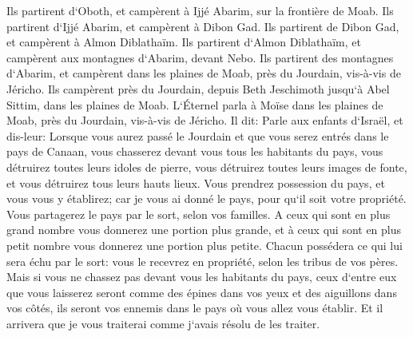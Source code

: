 \verse Ils partirent d`Oboth, et campèrent à Ijjé Abarim, sur la frontière de Moab. 
\verse Ils partirent d`Ijjé Abarim, et campèrent à Dibon Gad. 
\verse Ils partirent de Dibon Gad, et campèrent à Almon Diblathaïm. 
\verse Ils partirent d`Almon Diblathaïm, et campèrent aux montagnes d`Abarim, devant Nebo. 
\verse Ils partirent des montagnes d`Abarim, et campèrent dans les plaines de Moab, près du Jourdain, vis-à-vis de Jéricho. 
\verse Ils campèrent près du Jourdain, depuis Beth Jeschimoth jusqu`à Abel Sittim, dans les plaines de Moab. 
\verse L`Éternel parla à Moïse dans les plaines de Moab, près du Jourdain, vis-à-vis de Jéricho. Il dit: 
\verse Parle aux enfants d`Israël, et dis-leur: Lorsque vous aurez passé le Jourdain et que vous serez entrés dans le pays de Canaan, 
\verse vous chasserez devant vous tous les habitants du pays, vous détruirez toutes leurs idoles de pierre, vous détruirez toutes leurs images de fonte, et vous détruirez tous leurs hauts lieux. 
\verse Vous prendrez possession du pays, et vous vous y établirez; car je vous ai donné le pays, pour qu`il soit votre propriété. 
\verse Vous partagerez le pays par le sort, selon vos familles. A ceux qui sont en plus grand nombre vous donnerez une portion plus grande, et à ceux qui sont en plus petit nombre vous donnerez une portion plus petite. Chacun possédera ce qui lui sera échu par le sort: vous le recevrez en propriété, selon les tribus de vos pères. 
\verse Mais si vous ne chassez pas devant vous les habitants du pays, ceux d`entre eux que vous laisserez seront comme des épines dans vos yeux et des aiguillons dans vos côtés, ils seront vos ennemis dans le pays où vous allez vous établir. 
\verse Et il arrivera que je vous traiterai comme j`avais résolu de les traiter. 


